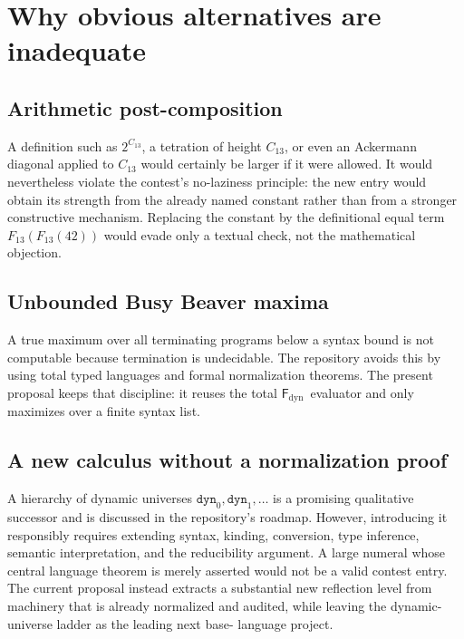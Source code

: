 \documentclass[11pt]{article}
\theoremstyle{definition}
\newcommand{\Fd}{\ensuremath{\mathsf{F}_{\mathrm{dyn}}}}
\begin{document}
\section{Why obvious alternatives are inadequate}

\subsection{Arithmetic post-composition}
A definition such as $2^{C_{13}}$, a tetration of height $C_{13}$, or even an
Ackermann diagonal applied to $C_{13}$ would certainly be larger if it were
allowed.  It would nevertheless violate the contest's no-laziness principle:
the new entry would obtain its strength from the already named constant rather
than from a stronger constructive mechanism.  Replacing the constant by the
definitional equal term $F_{13}(F_{13}(42))$ would evade only a textual check,
not the mathematical objection.

\subsection{Unbounded Busy Beaver maxima}
A true maximum over all terminating programs below a syntax bound is not
computable because termination is undecidable.  The repository avoids this by
using total typed languages and formal normalization theorems.  The present
proposal keeps that discipline: it reuses the total \Fd\ evaluator and only
maximizes over a finite syntax list.

\subsection{A new calculus without a normalization proof}
A hierarchy of dynamic universes $\mathtt{dyn}_0,\mathtt{dyn}_1,\ldots$ is a
promising qualitative successor and is discussed in the repository's roadmap.
However, introducing it responsibly requires extending syntax, kinding,
conversion, type inference, semantic interpretation, and the reducibility
argument.  A large numeral whose central language theorem is merely asserted
would not be a valid contest entry.  The current proposal instead extracts a
substantial new reflection level from machinery that is already normalized and
audited, while leaving the dynamic-universe ladder as the leading next base-
language project.

\end{document}
